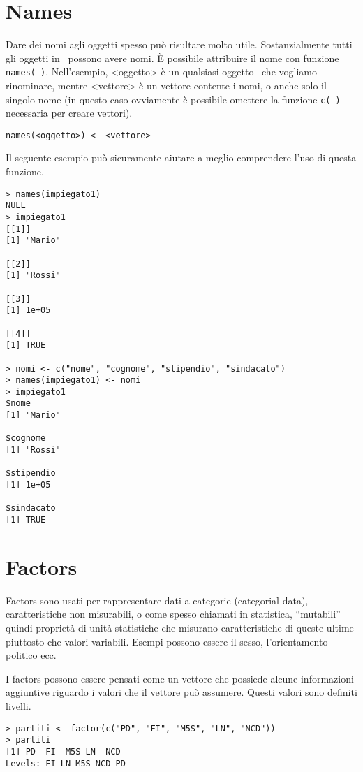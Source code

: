 \section{Names}

Dare dei nomi agli oggetti spesso può risultare molto utile. Sostanzialmente tutti gli oggetti in \erre\ possono avere nomi. È possibile attribuire il nome con funzione \lstinline!names( )!. Nell'esempio, <oggetto> è un qualsiasi oggetto \erre\ che vogliamo rinominare, mentre <vettore> è un vettore contente i nomi, o anche solo il singolo nome (in questo caso ovviamente è possibile omettere la funzione \lstinline!c( )! necessaria per creare vettori).

\begin{lstlisting}
names(<oggetto>) <- <vettore>
\end{lstlisting}

Il seguente esempio può sicuramente aiutare a meglio comprendere l'uso di questa funzione.

\begin{lstlisting}
> names(impiegato1)
NULL
> impiegato1
[[1]]
[1] "Mario"

[[2]]
[1] "Rossi"

[[3]]
[1] 1e+05

[[4]]
[1] TRUE

> nomi <- c("nome", "cognome", "stipendio", "sindacato")
> names(impiegato1) <- nomi
> impiegato1
$nome
[1] "Mario"

$cognome
[1] "Rossi"

$stipendio
[1] 1e+05

$sindacato
[1] TRUE
\end{lstlisting}

\section{Factors}

Factors sono usati per rappresentare dati a categorie (categorial data), caratteristiche non misurabili, o come spesso chiamati in statistica, ``mutabili'' quindi proprietà di unità statistiche che misurano caratteristiche di queste ultime piuttosto che valori variabili. Esempi possono essere il sesso, l'orientamento politico ecc.

I factors possono essere pensati come un vettore che possiede alcune informazioni aggiuntive riguardo i valori che il vettore può assumere. Questi valori sono definiti livelli.

\begin{lstlisting}
> partiti <- factor(c("PD", "FI", "M5S", "LN", "NCD"))
> partiti
[1] PD  FI  M5S LN  NCD
Levels: FI LN M5S NCD PD
\end{lstlisting}
